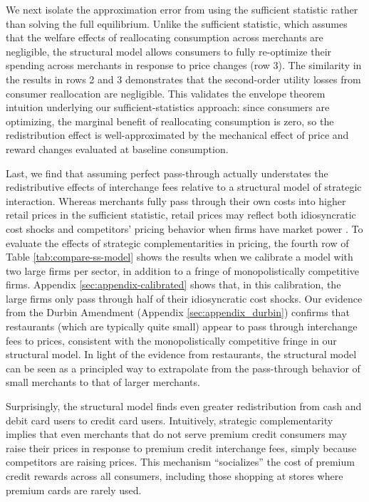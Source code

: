 \documentclass[main.tex]{subfiles}
\begin{document}
We next isolate the approximation error from using the sufficient statistic rather than solving the full equilibrium.
Unlike the sufficient statistic, which assumes that the welfare effects of reallocating consumption across merchants are negligible, the structural model allows consumers to fully re-optimize their spending across merchants in response to price changes (row 3).
The similarity in the results in rows 2 and 3 demonstrates that the second-order utility losses from consumer reallocation are negligible.
This validates the envelope theorem intuition underlying our sufficient-statistics approach: since consumers are optimizing, the marginal benefit of reallocating consumption is zero, so the redistribution effect is well-approximated by the mechanical effect of price and reward changes evaluated at baseline consumption.

Last, we find that assuming perfect pass-through actually understates the redistributive effects of interchange fees relative to a structural model of strategic interaction.
Whereas merchants fully pass through their own costs into higher retail prices in the sufficient statistic, retail prices may reflect both idiosyncratic cost shocks and competitors' pricing behavior when firms have market power \citep{Amiti.etal2019}.
To evaluate the effects of strategic complementarities in pricing, the fourth row of Table \ref{tab:compare-ss-model} shows the results when we calibrate a model with two large firms per sector, in addition to a fringe of monopolistically competitive firms.
Appendix \ref{sec:appendix-calibrated} shows that, in this calibration, the large firms only pass through half of their idiosyncratic cost shocks.
Our evidence from the Durbin Amendment (Appendix \ref{sec:appendix_durbin}) confirms that restaurants (which are typically quite small) appear to pass through interchange fees to prices, consistent with the monopolistically competitive fringe in our structural model.
In light of the evidence from restaurants, the structural model can be seen as a principled way to extrapolate from the pass-through behavior of small merchants to that of larger merchants.

Surprisingly, the structural model finds even greater redistribution from cash and debit card users to credit card users.
Intuitively, strategic complementarity implies that even merchants that do not serve premium credit consumers may raise their prices in response to premium credit interchange fees, simply because competitors are raising prices.
This mechanism ``socializes'' the cost of premium credit rewards across all consumers, including those shopping at stores where premium cards are rarely used.
\end{document}
